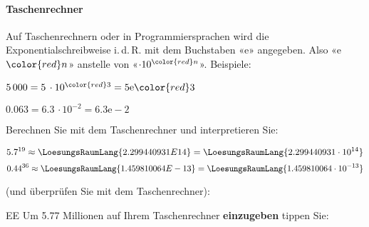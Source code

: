 \paragraph{Taschenrechner} Auf Taschenrechnern oder in
Programmiersprachen wird die Exponentialschreibweise i.\,d.\,R. mit dem
Buchstaben «e» angegeben. Also «e$\color{red}n$» anstelle von «$\cdot10^{\color{red}n}$». Beispiele:

$5\,000 = 5\, \cdot 10^{\color{red}3} = 5\mathrm{e}\color{red}3$

$0.063 = 6.3\, \cdot 10^{-2} = 6.3\mathrm{e-}2$

Berechnen Sie mit dem Taschenrechner und interpretieren Sie:

$$5.7^{19}  \approx  \LoesungsRaumLang{2.299440931\small{E}14}  = \LoesungsRaumLang{2.299440931 \cdot{} 10^{14}}$$
$$0.44^{36} \approx  \LoesungsRaumLang{1.459810064\small{E}-13} = \LoesungsRaumLang{1.459810064\cdot{} 10^{-13}}$$


(und überprüfen Sie mit dem Taschenrechner):

\begin{rezept}{EE}{}
    Um 5.77 Millionen auf Ihrem Taschenrechner \textbf{einzugeben} tippen Sie:

\begin{center}  \noTRAINER{\vspace{5mm}} \end{center}

\end{rezept}




\newpage
